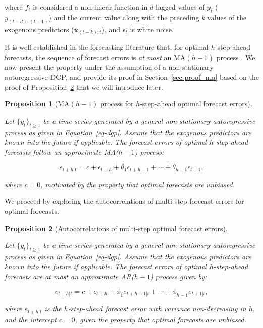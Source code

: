 \documentclass[
  11pt,
  a4paper,
]{article}
\theoremstyle{plain}
\newtheorem{proposition}{Proposition}[section]
\theoremstyle{plain}
\theoremstyle{remark}
\begin{document}
where \(f_{t}\) is considered a non-linear function in \(d\) lagged
values of \(y_t\) (\(y_{(t-d):(t-1)}\)) and the current value along with
the preceding \(k\) values of the exogenous predictors
(\(\bm{x}_{(t-k):t}\)), and \(\epsilon_t\) is white noise.

It is well-established in the forecasting literature that, for optimal
\(h\)-step-ahead forecasts, the sequence of forecast errors is \emph{at
most} an MA\((h-1)\) process \autocite{harvey1997,diebold2017}. We now
present the property under the assumption of a non-stationary
autoregressive DGP, and provide its proof in Section~\ref{sec-proof_ma}
based on the proof of Proposition~\ref{prp-ar} that we will introduce
later.

\begin{proposition}[MA\((h-1)\) process for \(h\)-step-ahead optimal
forecast errors]\protect\hypertarget{prp-ma}{}\label{prp-ma}

Let \(\{y_t\}_{t \geq 1}\) be a time series generated by a general
non-stationary autoregressive process as given in Equation~\ref{eq-dgp}.
Assume that the exogenous predictors are known into the future if
applicable. The forecast errors of optimal \(h\)-step-ahead forecasts
follow an approximate MA(\(h-1\)) process:

\[
e_{t+h|t} = c + \epsilon_{t+h} + \theta_1\epsilon_{t+h-1} + \cdots + \theta_{h-1}\epsilon_{t+1},
\]

where \(c=0\), motivated by the property that optimal forecasts are
unbiased.

\end{proposition}

We proceed by exploring the autocorrelations of multi-step forecast
errors for optimal forecasts.

\begin{proposition}[Autocorrelations of multi-step optimal forecast
errors]\protect\hypertarget{prp-ar}{}\label{prp-ar}

Let \(\{y_t\}_{t \geq 1}\) be a time series generated by a general
non-stationary autoregressive process as given in Equation~\ref{eq-dgp}.
Assume that the exogenous predictors are known into the future if
applicable. The forecast errors of optimal \(h\)-step-ahead forecasts
are \ul{at most} an approximate AR(\(h-1\)) process given by:

\[
e_{t+h|t} = c + \epsilon_{t+h} + \phi_1e_{t+h-1|t} + \cdots + \phi_{h-1}e_{t+1|t},
\]

where \(e_{t+h|t}\) is the \(h\)-step-ahead forecast error with variance
non-decreasing in \(h\), and the intercept \(c=0\), given the property
that optimal forecasts are unbiased.

\end{proposition}
\end{document}
